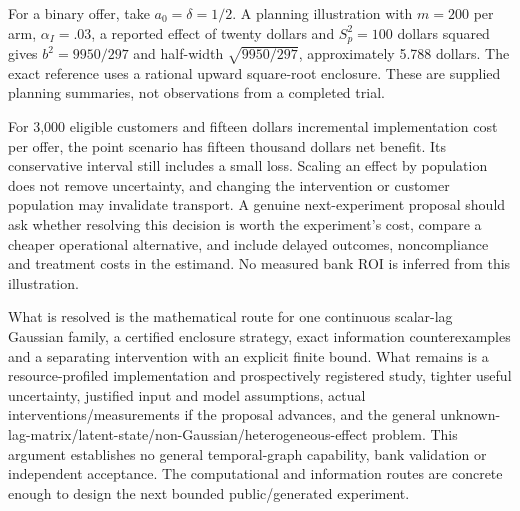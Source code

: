 For a binary offer, take \(a_0=\delta=1/2\). A planning illustration
with \(m=200\) per arm, \(\alpha_I=.03\), a reported effect of twenty
dollars and \(S_p^2=100\) dollars squared gives \(b^2=9950/297\) and
half-width \(\sqrt{9950/297}\), approximately 5.788 dollars. The exact
reference uses a rational upward square-root enclosure. These are
supplied planning summaries, not observations from a completed trial.

For 3,000 eligible customers and fifteen dollars incremental
implementation cost per offer, the point scenario has fifteen thousand
dollars net benefit. Its conservative interval still includes a small
loss. Scaling an effect by population does not remove uncertainty, and
changing the intervention or customer population may invalidate
transport. A genuine next-experiment proposal should ask whether
resolving this decision is worth the experiment's cost, compare a
cheaper operational alternative, and include delayed outcomes,
noncompliance and treatment costs in the estimand. No measured bank ROI
is inferred from this illustration.

What is resolved is the mathematical route for one continuous scalar-lag
Gaussian family, a certified enclosure strategy, exact information
counterexamples and a separating intervention with an explicit finite
bound. What remains is a resource-profiled implementation and
prospectively registered study, tighter useful uncertainty, justified
input and model assumptions, actual interventions/measurements if the
proposal advances, and the general
unknown-lag-matrix/latent-state/non-Gaussian/heterogeneous-effect
problem. This argument establishes no general temporal-graph capability,
bank validation or independent acceptance. The computational and
information routes are concrete enough to design the next bounded
public/generated experiment.

\label{exec13:temporal-region-end}
